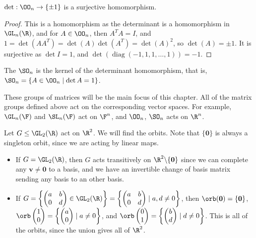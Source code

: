 \documentclass[a4]{scrreprt}
\begin{document}
\begin{proposition}
	$\det : \OO_n \rightarrow \{\pm 1\}$ is a surjective homomorphism. 
\end{proposition}
\begin{proof}
	This is a homomorphism as the determinant is a homomorphism in $\GL_n(\R)$, and for $A \in \OO_n$, then $A^T A = I$, and $1 = \det(A A^T) = \det(A)\det(A^T) = \det(A)^2$, so $\det(A) = \pm 1$. It is surjective as $\det I = 1$, and $\det(\operatorname{diag}(-1, 1, 1, \dots, 1)) = -1$.
\end{proof}

\begin{definition}
	The  $\SO_n$ is the kernel of the determinant homomorphism, that is, $\SO_n = \{A \in \OO_n \mid \det A = 1 \}$.
\end{definition}

These groups of matrices will be the main focus of this chapter.
All of the matrix groups defined above act on the corresponding vector spaces. For example, $\GL_n(\F)$ and $\SL_n(\F)$ act on $\F^n$, and $\OO_n$, $\SO_n$ acts on $\R^n$.

\begin{example}
	Let $G \leq \GL_2(\R)$ act on $\R^2$. We will find the orbits. 
	Note that $\{\mathbf{0}\}$ is always a singleton orbit, since we are acting by linear maps.
	
\begin{itemize}
	\item If $G = \GL_2(\R)$, then $G$ acts transitively on $\R^2\backslash \{\mathbf{0}\}$ since we can complete any $\mathbf{v} \neq \mathbf{0}$ to a basis, and we have an invertible change of basis matrix sending any basis to an other basis.
	\item If $G = \left\{\begin{pmatrix}
		a & b \\ 0 & d
	\end{pmatrix} \in \GL_2(\R)\right\} =\left\{ \begin{pmatrix}
		a & b \\
		0 & d
	\end{pmatrix} \mid a, d \neq 0 \right\}$, then $\orb(\mathbf{0}) = \{\mathbf{0}\}$, $\orb\begin{pmatrix}
		1 \\ 0
	\end{pmatrix} = \left\{\begin{pmatrix}
		a \\ 0
	\end{pmatrix} \mid a \neq 0 \right\}$, and $\orb\begin{pmatrix}
		0 \\ 1
	\end{pmatrix} =\left \{\begin{pmatrix}
		b\\ d
	\end{pmatrix} \mid d \neq 0 \right\}$. This is all of the orbits, since the union gives all of $\R^2$.
\end{itemize}
\end{example}
\end{document}
